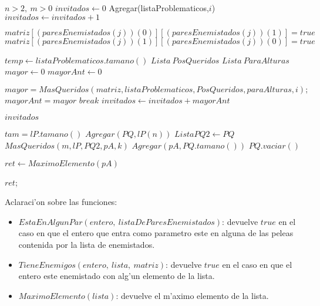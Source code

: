 \begin{algorithmic}[1]
\REQUIRE $n > 2,\ m > 0$
\STATE $invitados \leftarrow 0$
		\STATE Agregar(listaProblematicos,$i$)
	\ELSE
		\STATE $invitados \leftarrow invitados + 1$
	\ENDIF
\ENDFOR

	\STATE $matriz[(paresEnemistados(j))(0)][(paresEnemistados(j))(1)] = true$
	\STATE $matriz[(paresEnemistados(j))(1)][(paresEnemistados(j))(0)] = true$
\ENDFOR

\STATE $temp \leftarrow listaProblematicos.tamano()$
\STATE $Lista\ PosQueridos$
\STATE $Lista\ ParaAlturas $
\STATE $mayor\leftarrow 0$
\STATE $mayorAnt \leftarrow 0$

		\STATE $mayor = MasQueridos(matriz, listaProblematicos,PosQueridos,paraAlturas, i);$
			\STATE $mayorAnt = mayor$
		\ENDIF
		\ELSE
			\STATE $break$
	\ENDIF
\ENDFOR
\STATE $invitados \leftarrow invitados + mayorAnt$

\RETURN $invitados$

\end{algorithmic}

\vspace{2em}

\begin{algorithmic}[1]
\STATE $tam = lP.tamano()$
\STATE $Agregar(PQ,lP(n))$
		\STATE $Lista PQ2 \leftarrow PQ$
		\STATE $MasQueridos(m, lP, PQ2, pA, k)$
	\ENDIF
\ENDFOR
\STATE $Agregar(pA,PQ.tamano())$
\STATE $PQ.vaciar()$

\STATE $ret \leftarrow MaximoElemento(pA)$

\RETURN $ret$;

\end{algorithmic}

Aclaraci'on sobre las funciones:
\begin{itemize}
\item $EstaEnAlgunPar(entero,\ listaDeParesEnemistados)$: devuelve $true$ en el caso en que el entero que entra como parametro este en alguna de las peleas contenida por la lista de enemistados.
\item $TieneEnemigos(entero,\ lista,\ matriz)$: devuelve $true$ en el caso en que el entero este enemistado con alg'un elemento de la lista.
\item $MaximoElemento(lista)$: devuelve el m'aximo elemento de la lista.
\end{itemize}

